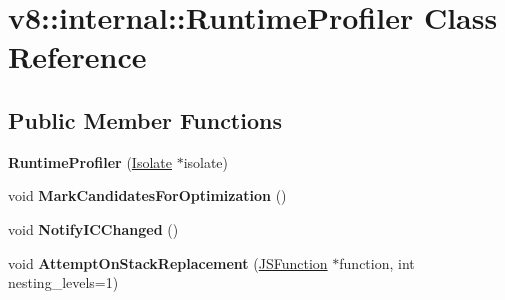 \hypertarget{classv8_1_1internal_1_1_runtime_profiler}{}\section{v8\+:\+:internal\+:\+:Runtime\+Profiler Class Reference}
\label{classv8_1_1internal_1_1_runtime_profiler}
\subsection*{Public Member Functions}
\begin{DoxyCompactItemize}
\item 
{\bfseries Runtime\+Profiler} (\hyperlink{classv8_1_1internal_1_1_isolate}{Isolate} $\ast$isolate)\hypertarget{classv8_1_1internal_1_1_runtime_profiler_a1953dfce58c78e2f4c9e136b08cbfa8d}{}\label{classv8_1_1internal_1_1_runtime_profiler_a1953dfce58c78e2f4c9e136b08cbfa8d}

\item 
void {\bfseries Mark\+Candidates\+For\+Optimization} ()\hypertarget{classv8_1_1internal_1_1_runtime_profiler_a9b971bcdc311199571e8b9ce2e9ee3e6}{}\label{classv8_1_1internal_1_1_runtime_profiler_a9b971bcdc311199571e8b9ce2e9ee3e6}

\item 
void {\bfseries Notify\+I\+C\+Changed} ()\hypertarget{classv8_1_1internal_1_1_runtime_profiler_a9b44870acbaf140a44bb8261a055d592}{}\label{classv8_1_1internal_1_1_runtime_profiler_a9b44870acbaf140a44bb8261a055d592}

\item 
void {\bfseries Attempt\+On\+Stack\+Replacement} (\hyperlink{classv8_1_1internal_1_1_j_s_function}{J\+S\+Function} $\ast$function, int nesting\+\_\+levels=1)\hypertarget{classv8_1_1internal_1_1_runtime_profiler_af5e470de37a1598dc1fee837a5e9fdef}{}\label{classv8_1_1internal_1_1_runtime_profiler_af5e470de37a1598dc1fee837a5e9fdef}

\end{DoxyCompactItemize}
